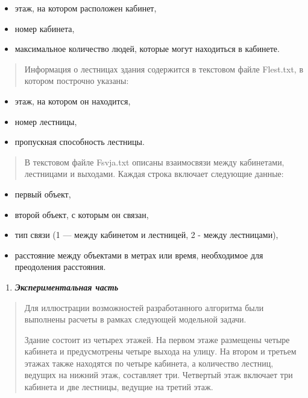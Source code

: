 \documentclass[
]{article}
\begin{document}
\begin{itemize}
\item
  этаж, на котором расположен кабинет,
\item
  номер кабинета,
\item
  максимальное количество людей, которые могут находиться в кабинете.
\end{itemize}

\begin{quote}
Информация о лестницах здания содержится в текстовом файле Flest.txt, в
котором построчно указаны:
\end{quote}

\begin{itemize}
\item
  этаж, на котором он находится,
\item
  номер лестницы,
\item
  пропускная способность лестницы.
\end{itemize}

\begin{quote}
В текстовом файле Fsvja.txt описаны взаимосвязи между кабинетами,
лестницами и выходами. Каждая строка включает следующие данные:
\end{quote}

\begin{itemize}
\item
  первый объект,
\item
  второй объект, с которым он связан,
\item
  тип связи (1 --- между кабинетом и лестницей, 2 - между лестницами),
\item
  расстояние между объектами в метрах или время, необходимое для
  преодоления расстояния.
\end{itemize}

\begin{enumerate}
\def\labelenumi{\arabic{enumi}.}
\setcounter{enumi}{3}
\item
  \emph{\textbf{Экспериментальная часть}}
\end{enumerate}

\begin{quote}
Для иллюстрации возможностей разработанного алгоритма были выполнены
расчеты в рамках следующей модельной задачи.

Здание состоит из четырех этажей. На первом этаже размещены четыре
кабинета и предусмотрены четыре выхода на улицу. На втором и третьем
этажах также находятся по четыре кабинета, а количество лестниц, ведущих
на нижний этаж, составляет три. Четвертый этаж включает три кабинета и
две лестницы, ведущие на третий этаж.
\end{quote}
\end{document}
